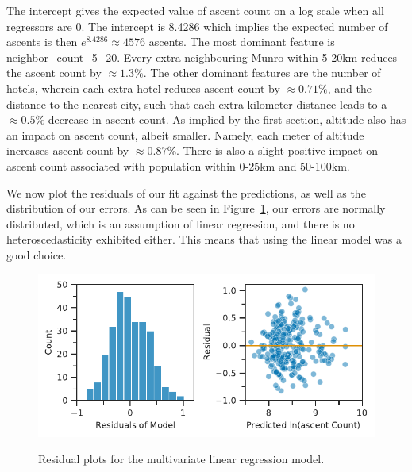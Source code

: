 \documentclass[11pt,a4paper]{article}
\begin{document}
The intercept gives the expected value of ascent count on a log scale when all regressors are 0. The intercept is 8.4286 which implies the expected number of ascents is then $e^{8.4286} \approx 4576$ ascents. The most dominant feature is neighbor\_count\_5\_20. Every extra neighbouring Munro within 5-20km reduces the ascent count by $ \approx 1.3\%$. The other dominant features are the number of hotels, wherein each extra hotel reduces ascent count by $\approx 0.71\%$, and the distance to the nearest city, such that each extra kilometer distance leads to a $\approx 0.5\%$ decrease in ascent count. As implied by the first section, altitude also has an impact on ascent count, albeit smaller. Namely, each meter of altitude increases ascent count by $\approx 0.87\%$. There is also a slight positive impact on ascent count associated with population within 0-25km and 50-100km.

We now plot the residuals of our fit against the predictions, as well as the distribution of our errors. As can be seen in Figure~\ref{fds-project-template:fig:multi_residuals_dist}, our errors are normally distributed, which is an assumption of linear regression, and there is no heteroscedasticity exhibited either. This means that using the linear model was a good choice.
\begin{figure} [h!]
    \centering
    \includegraphics{report/multi_residuals_dist.pdf}
    \begin{minipage}[t]{.5\linewidth}
        \centering
        \label{fds-project-template:fig:uni_residuals_dist}
    \end{minipage}%
    \begin{minipage}[t]{.5\linewidth}
        \centering
        \label{fds-project-template:fig:uni_residuals_yhat}
    \end{minipage}
    \caption{Residual plots for the multivariate linear regression model.}
    \label{fds-project-template:fig:multi_residuals_dist}
\end{figure}
\end{document}
